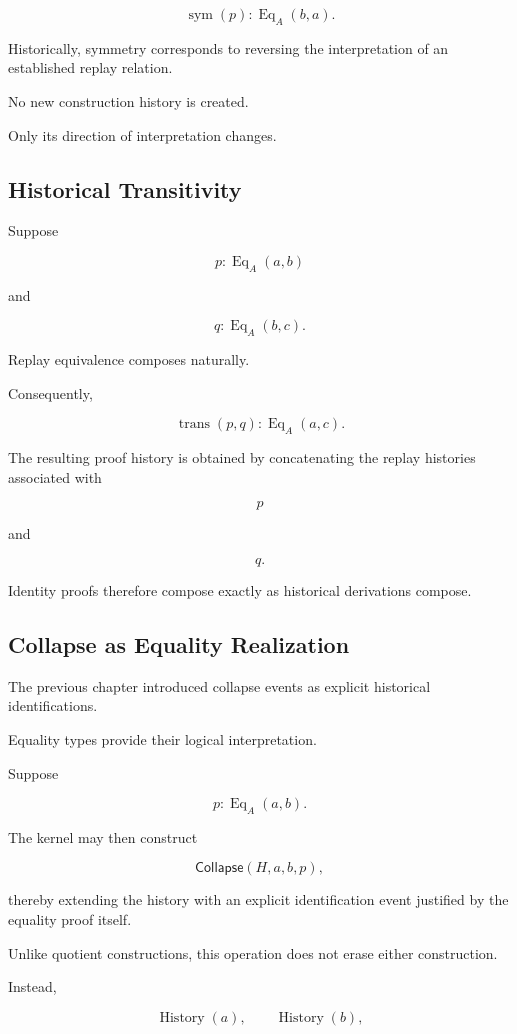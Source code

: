 \documentclass[12pt,oneside]{article}
\theoremstyle{definition}
\theoremstyle{remark}
\newcommand{\Collapse}{\mathsf{Collapse}}
\DeclareMathOperator{\History}{History}
\begin{document}
\[
\operatorname{sym}(p)
:
\operatorname{Eq}_A(b,a).
\]

Historically, symmetry corresponds to reversing the interpretation of an
established replay relation.

No new construction history is created.

Only its direction of interpretation changes.

\subsection{Historical Transitivity}

Suppose

\[
p
:
\operatorname{Eq}_A(a,b)
\]

and

\[
q
:
\operatorname{Eq}_A(b,c).
\]

Replay equivalence composes naturally.

Consequently,

\[
\operatorname{trans}(p,q)
:
\operatorname{Eq}_A(a,c).
\]

The resulting proof history is obtained by concatenating the replay histories
associated with

\[
p
\]

and

\[
q.
\]

Identity proofs therefore compose exactly as historical derivations compose.

\subsection{Collapse as Equality Realization}

The previous chapter introduced collapse events as explicit historical
identifications.

Equality types provide their logical interpretation.

Suppose

\[
p
:
\operatorname{Eq}_A(a,b).
\]

The kernel may then construct

\[
\Collapse(H,a,b,p),
\]

thereby extending the history with an explicit identification event justified
by the equality proof itself.

Unlike quotient constructions, this operation does not erase either
construction.

Instead,

\[
\History(a),
\qquad
\History(b),
\]
\end{document}
